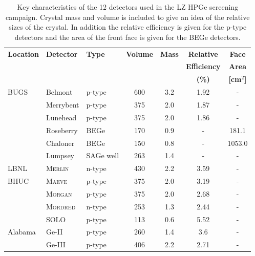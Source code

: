 \begin{table}[h]
\centering
\caption{Key characteristics of the 12 detectors used in the LZ HPGe screening campaign. Crystal mass and volume is included to give an idea of the relative sizes of the crystal. In addition the relative efficiency is given for the p-type detectors and the area of the front face is given for the BEGe detectors.}
    \label{tab:GeDetInf}
    \vspace{1mm}
    \renewcommand{\arraystretch}{1.1}
    \begin{tabular}{ lllcccc }
    \toprule
    
    \multirow{3}{*}{\textbf{Location}} & %
    \multirow{3}{*}{\textbf{Detector}} & %
    \multirow{3}{*}{\textbf{Type}} & %
    \multirow{2}{*}{\textbf{Volume}} & %
    \multirow{2}{*}{\textbf{Mass}} & %
    \textbf{Relative} & %
    \textbf{Face} %
    \\
    &
    & %
    & %
    \multirow{2}{*}{\textbf{[cm$^{3}$]}} & %
    \multirow{2}{*}{\textbf{[kg]}} & %
    \textbf{Efficiency} & %
    \textbf{Area} %
    \\
    &
    & %
    & %
    & %
    & %
    \textbf{(\%)} & %
    \textbf{[cm$^{2}$]} %
    \\
    \hline
    \hline

    \multirow{6}{*}{BUGS} & Belmont & p-type & 600 & 3.2 & 1.92 & - \\
    & Merrybent & p-type & 375 & 2.0 & 1.87 & - \\
    & Lunehead & p-type & 375 & 2.0 & 1.86 & - \\
    & Roseberry & BEGe & 170 & 0.9 & - & 181.1 \\
    & Chaloner & BEGe & 150 & 0.8 & - & 1053.0 \\
    & Lumpsey & SAGe well & 263 & 1.4 & - & - \\
    \hline
    LBNL & \textsc{Merlin} & n-type & 430 & 2.2 &3.59 & - \\
    \hline
    \multirow{4}{*}{BHUC}& \textsc{Maeve} & p-type & 375 & 2.0 &3.19 & - \\
    & \textsc{Morgan} & p-type & 375 & 2.0 & 2.68 & - \\
    & \textsc{Mordred} & n-type & 253 & 1.3 &2.44 & - \\
    & SOLO & p-type & 113 & 0.6 & 5.52 & - \\
    \hline
    \multirow{2}{*}{Alabama} & Ge-II  & p-type & 260 & 1.4 & 3.6  & - \\
    & Ge-III & p-type & 406 & 2.2 & 2.71 & - \\
    
    \bottomrule
\end{tabular}
\end{table}